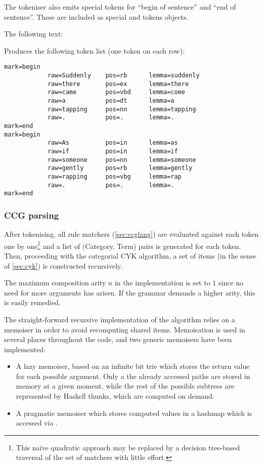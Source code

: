 \documentclass[main.tex]{subfiles}
\begin{document}
The tokeniser also emits special tokens for ``begin of sentence'' and ``end of
sentence''. These are included as special  and 
tokens objects.

\begin{example}
    The following text:
    \begin{center}
    \end{center}

    Produces the following token list (one token on each row):
\begin{lstlisting}
mark=begin
            raw=Suddenly    pos=rb      lemma=suddenly
            raw=there       pos=ex      lemma=there
            raw=came        pos=vbd     lemma=come
            raw=a           pos=dt      lemma=a
            raw=tapping     pos=nn      lemma=tapping
            raw=.           pos=.       lemma=.
mark=end
mark=begin
            raw=As          pos=in      lemma=as
            raw=if          pos=in      lemma=if
            raw=someone     pos=nn      lemma=someone
            raw=gently      pos=rb      lemma=gently
            raw=rapping     pos=vbg     lemma=rap
            raw=.           pos=.       lemma=.
mark=end
\end{lstlisting}
\end{example}

\subsubsection{CCG parsing}
After tokenising, all rule matchers (\cref{sec:ccglang}) are evaluated against
each token one by one\footnote{This naïve quadratic approach may be replaced
    by a decision tree-based traversal of the set of matchers with little
    effort.} and a list of (Category, Term) pairs is generated for each token.
Then, proceeding with the categorial CYK algorithm, a set of items (in the
sense of \cref{sec:cyk}) is constructed recursively.

The maximum composition arity $n$ in the implementation is set to $1$ since no need
for more arguments has arisen. If the grammar demands a higher arity, this
is easily remedied.

The straight-forward recursive implementation of the algorithm relies on a
memoiser in order to avoid recomputing shared items. Memoisation is used in
several places throughout the code, and two generic memoisers have been
implemented:
\begin{itemize}
    \item A lazy memoiser, based on an infinite bit trie which stores the return
        value for each possible argument. Only a the already accessed paths are
        stored in memory at a given moment, while the rest of the possible
        subtrees are represented by Haskell thunks, which are computed on
        demand.
    \item A pragmatic memoiser which stores computed values in a hashmap which
        is accessed via .
\end{itemize}
\end{document}
